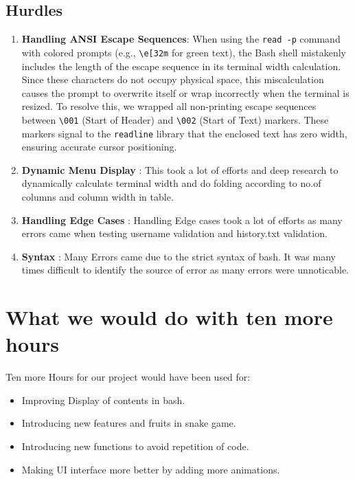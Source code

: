 \documentclass[12pt]{article}
\begin{document}
    \subsection{Hurdles}
        \begin{enumerate}
    \item \textbf{Handling ANSI Escape Sequences}: When using the \texttt{read -p} command with colored prompts (e.g., \texttt{\textbackslash e[32m} for green text), the Bash shell mistakenly includes the length of the escape sequence in its terminal width calculation. Since these characters do not occupy physical space, this miscalculation causes the prompt to overwrite itself or wrap incorrectly when the terminal is resized. To resolve this, we wrapped all non-printing escape sequences between \texttt{\textbackslash 001} (Start of Header) and \texttt{\textbackslash 002} (Start of Text) markers. These markers signal to the \texttt{readline} library that the enclosed text has zero width, ensuring accurate cursor positioning.

    \item \textbf{Dynamic Menu Display} : This took a lot of efforts and deep research to dynamically calculate terminal width and do folding according to no.of columns and column width in table.

    \item \textbf{Handling Edge Cases} : Handling Edge cases took a lot of efforts as many errors came when testing username validation and history.txt validation.

    \item \textbf{Syntax} : Many Errors came due to the strict syntax of bash. It was many times difficult to identify the source of error as many errors were unnoticable.
\end{enumerate}

    
\section{What we would do with ten more hours}
Ten more Hours for our project would have been used for:
    \begin{itemize}
        \item Improving Display of contents in bash.
        \item Introducing new features and fruits in snake game.
        \item Introducing new functions to avoid repetition of code.
        \item Making UI interface more better by adding more animations.
    \end{itemize}

\end{document}
